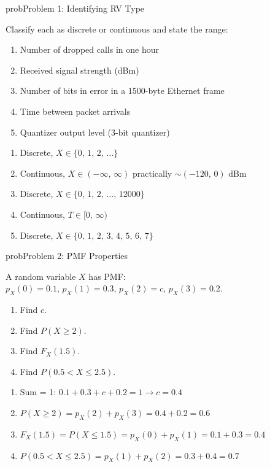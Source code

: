 
\begin{PSbox}[unbreakable]{prob}{Problem 1: Identifying RV Type}

Classify each as discrete or continuous and state the range:

\begin{enumerate}
\def\labelenumi{(\alph{enumi})}
\tightlist
\item
  Number of dropped calls in one hour
\item
  Received signal strength (dBm)
\item
  Number of bits in error in a 1500-byte Ethernet frame
\item
  Time between packet arrivals
\item
  Quantizer output level (3-bit quantizer)
\end{enumerate}

\PSsolution{} 

\begin{enumerate}
\def\labelenumi{(\alph{enumi})}
\tightlist
\item
  Discrete, $X \in \{0,\, 1,\, 2,\, \ldots \}$
\item
  Continuous, $X \in (-\infty,\, \infty)$ practically $\sim (-120,\, 0)$ dBm
\item
  Discrete, $X \in \{0,\, 1,\, 2,\, \ldots,\, 12000\}$
\item
  Continuous, $T \in [0,\, \infty)$
\item
  Discrete, $X \in \{0,\, 1,\, 2,\, 3,\, 4,\, 5,\, 6,\, 7\}$
\end{enumerate}

\end{PSbox}

\begin{PSbox}[unbreakable]{prob}{Problem 2: PMF Properties}

A random variable $X$ has PMF: $p_{X}(0) = 0.1,\, p_{X}(1) = 0.3,\, p_{X}(2) = c,\, p_{X}(3) = 0.2$.

\begin{enumerate}
\def\labelenumi{(\alph{enumi})}
\tightlist
\item
  Find $c$.
\item
  Find $P(X \ge 2)$.
\item
  Find $F_{X}(1.5)$.
\item
  Find $P(0.5 < X \le 2.5)$.
\end{enumerate}

\PSsolution{} 

\begin{enumerate}
\def\labelenumi{(\alph{enumi})}
\item
  Sum = 1: $0.1 + 0.3 + c + 0.2 = 1 \to c = 0.4$
\item
  $P(X \ge 2) = p_{X}(2) + p_{X}(3) = 0.4 + 0.2 = 0.6$
\item
  $F_{X}(1.5) = P(X \le 1.5) = p_{X}(0) + p_{X}(1) = 0.1 + 0.3 = 0.4$
\item
  $P(0.5 < X \le 2.5) = p_{X}(1) + p_{X}(2) = 0.3 + 0.4 = 0.7$
\end{enumerate}

\end{PSbox}

